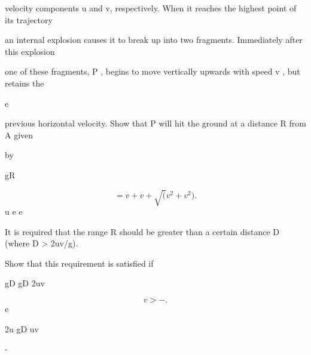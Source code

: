 \documentclass[12pt]{article}
\begin{document}
\begin{flushleft}
velocity components u and v, respectively. When it reaches the highest point of its trajectory\par
an internal explosion causes it to break up into two fragments. Immediately after this explosion\par
one of these fragments, P , begins to move vertically upwards with speed v , but retains the\par
e\par
previous horizontal velocity. Show that P will hit the ground at a distance R from A given\par
by\par
gR\par
\[= v + v + \sqrt(v^2 + v^2).\]
u e e\par
It is required that the range R should be greater than a certain distance D (where D > 2uv/g).\par
Show that this requirement is satisfied if\par
gD gD 2uv\par
\[v > - .\]
e\par
2u \lambda gD uv \mu\par
-\par
[The effect of air resistance is to be neglected.]\par
\end{flushleft}
\end{document}
